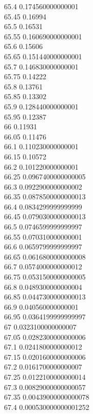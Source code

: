 {65.4	0.174560000000001\\
65.45	0.16994\\
65.5	0.16531\\
65.55	0.160690000000001\\
65.6	0.15606\\
65.65	0.151440000000001\\
65.7	0.146830000000001\\
65.75	0.14222\\
65.8	0.13761\\
65.85	0.13302\\
65.9	0.128440000000001\\
65.95	0.12387\\
66	0.11931\\
66.05	0.11476\\
66.1	0.110230000000001\\
66.15	0.10572\\
66.2	0.101220000000001\\
66.25	0.0967400000000005\\
66.3	0.0922900000000002\\
66.35	0.0878500000000013\\
66.4	0.0834299999999999\\
66.45	0.0790300000000013\\
66.5	0.0746599999999997\\
66.55	0.070310000000001\\
66.6	0.0659799999999997\\
66.65	0.0616800000000008\\
66.7	0.0574000000000012\\
66.75	0.0531500000000005\\
66.8	0.0489300000000004\\
66.85	0.0447300000000013\\
66.9	0.040560000000001\\
66.95	0.0364199999999997\\
67	0.0323100000000007\\
67.05	0.0282300000000006\\
67.1	0.0241800000000012\\
67.15	0.0201600000000006\\
67.2	0.0161700000000007\\
67.25	0.0122100000000014\\
67.3	0.00829000000000057\\
67.35	0.00439000000000078\\
67.4	0.000530000000001252\\
}
